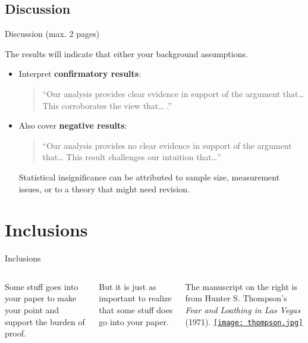 \documentclass[t]{beamer}
\begin{document}
	\subsection{Discussion}
	
	\begin{frame}[t]{Discussion (max. 2 pages)}

		The results will indicate  that either  your background assumptions.
		
		\begin{itemize}
			\item Interpret \textbf{confirmatory results}: \\
			\begin{quote}``Our analysis provides clear evidence in support of the argument  that… This corroborates the view that… .''\end{quote}

			\item Also cover \textbf{negative results}: \\
			\begin{quote}``Our analysis provides no clear evidence in support of the argument  that… This result challenges our intuition that…''\end{quote}

			Statistical insignificance can be attributed to sample size, measurement issues, or to a theory that might need revision.			
		\end{itemize}

	\end{frame}
	
	\section{Inclusions}

	\begin{frame}[t]{Inclusions}
		\begin{columns}[T]
			Some stuff  goes into your paper to make your point and support the burden of proof.\vspace{1em}
			
			But it is just as important to realize that some stuff does  go into your paper.\vspace{1em}
			
			The manuscript on the right is from Hunter S. Thompson's \textit{Fear and Loathing in Las Vegas} (1971).
			\href{http://www.theparisreview.org/interviews/619/the-art-of-journalism-no-1-hunter-s-thompson}{\texttt{[image: thompson.jpg]}}
		\end{columns}
	\end{frame}
	
\end{document}
